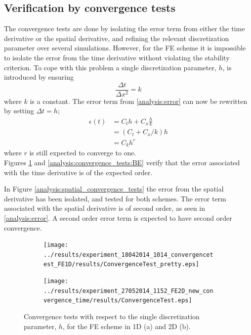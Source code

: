 \subsection{Verification by convergence tests}

The convergence tests are done by isolating the error term from either the time derivative or the spatial derivative, and refining the relevant discretization parameter over several simulations. 
However, for the FE scheme it is impossible to isolate the error from the time derivative without violating the stability criterion. 
To cope with this problem a single discretization parameter, $h$, is introduced by ensuring  
\begin{equation*}
 \frac{\Delta t}{\Delta x^2} = k
\end{equation*}
where $k$ is a constant. 
The error term from \eqref{analysis:error} can now be rewritten by setting $\Delta t = h$;
\begin{align*}
 \epsilon(t) &= C_t h + C_x\frac{h}{k} \\
 &= (C_t +C_x/k)h \\
 &= C_k h^r
\end{align*}
where $r$ is still expected to converge to one.  \\

\noindent Figures \ref{analysis:convergence_tests:FE} and \ref{analysis:convergence_tests:BE} verify that the error associated with the time derivative is of the expected order. 

In Figure \ref{analysis:spatial_convergence_tests} the error from the spatial derivative has been isolated, and tested for both schemes. 
The error term associated with the spatial derivative is of second order, as seen in \eqref{analysis:error}. A second order error term is expected to have second order convergence.

\begin{figure}[h]
\centering
 \begin{subfigure}{0.49\textwidth}
  \texttt{[image: ../results/experiment\_18042014\_1014\_convergencetest\_FE1D/results/ConvergenceTest\_pretty.eps]}
  \caption{}
 \end{subfigure}
 \begin{subfigure}{0.49\textwidth}
  \texttt{[image: ../results/experiment\_27052014\_1152\_FE2D\_new\_convergence\_time/results/ConvergenceTest.eps]}
  \caption{}
 \end{subfigure}
 \caption[Convergence tests in time FE scheme]{Convergence tests with respect to the single discretization parameter, $h$, for the FE scheme in 1D (a) and 2D (b). }
 \label{analysis:convergence_tests:FE}
\end{figure}

